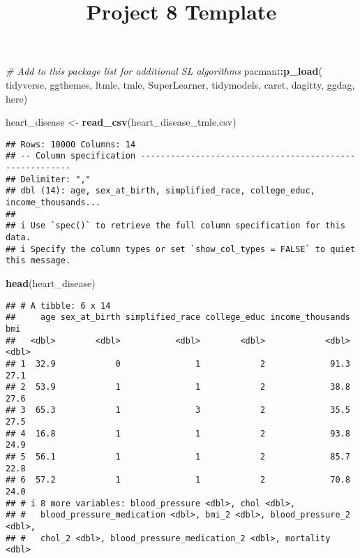 \documentclass[
]{article}
\title{Project 8 Template}
\author{}
\date{\vspace{-2.5em}}
\newenvironment{Shaded}{\begin{snugshade}}{\end{snugshade}}
\newcommand{\CommentTok}[1]{\textcolor[rgb]{0.56,0.35,0.01}{\textit{#1}}}
\newcommand{\FunctionTok}[1]{\textcolor[rgb]{0.13,0.29,0.53}{\textbf{#1}}}
\newcommand{\NormalTok}[1]{#1}
\newcommand{\OtherTok}[1]{\textcolor[rgb]{0.56,0.35,0.01}{#1}}
\newcommand{\SpecialCharTok}[1]{\textcolor[rgb]{0.81,0.36,0.00}{\textbf{#1}}}
\newcommand{\StringTok}[1]{\textcolor[rgb]{0.31,0.60,0.02}{#1}}
\begin{document}
\maketitle

\begin{Shaded}
\begin{Highlighting}[]
\CommentTok{\# Add to this package list for additional SL algorithms}
\NormalTok{pacman}\SpecialCharTok{::}\FunctionTok{p\_load}\NormalTok{(}
\NormalTok{  tidyverse,}
\NormalTok{  ggthemes,}
\NormalTok{  ltmle,}
\NormalTok{  tmle,}
\NormalTok{  SuperLearner,}
\NormalTok{  tidymodels,}
\NormalTok{  caret,}
\NormalTok{  dagitty,}
\NormalTok{  ggdag,}
\NormalTok{  here)}

\NormalTok{heart\_disease }\OtherTok{\textless{}{-}} \FunctionTok{read\_csv}\NormalTok{(}\StringTok{\textquotesingle{}heart\_disease\_tmle.csv\textquotesingle{}}\NormalTok{)}
\end{Highlighting}
\end{Shaded}

\begin{verbatim}
## Rows: 10000 Columns: 14
## -- Column specification --------------------------------------------------------
## Delimiter: ","
## dbl (14): age, sex_at_birth, simplified_race, college_educ, income_thousands...
## 
## i Use `spec()` to retrieve the full column specification for this data.
## i Specify the column types or set `show_col_types = FALSE` to quiet this message.
\end{verbatim}

\begin{Shaded}
\begin{Highlighting}[]
\FunctionTok{head}\NormalTok{(heart\_disease)}
\end{Highlighting}
\end{Shaded}

\begin{verbatim}
## # A tibble: 6 x 14
##     age sex_at_birth simplified_race college_educ income_thousands   bmi
##   <dbl>        <dbl>           <dbl>        <dbl>            <dbl> <dbl>
## 1  32.9            0               1            2             91.3  27.1
## 2  53.9            1               1            2             38.8  27.6
## 3  65.3            1               3            2             35.5  27.5
## 4  16.8            1               1            2             93.8  24.9
## 5  56.1            1               1            2             85.7  22.8
## 6  57.2            1               1            2             70.8  24.0
## # i 8 more variables: blood_pressure <dbl>, chol <dbl>,
## #   blood_pressure_medication <dbl>, bmi_2 <dbl>, blood_pressure_2 <dbl>,
## #   chol_2 <dbl>, blood_pressure_medication_2 <dbl>, mortality <dbl>
\end{verbatim}
\end{document}
